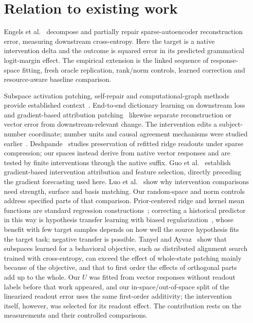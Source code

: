 \documentclass[11pt]{article}
\begin{document}
\section{Relation to existing work}
Engels et al.~\cite{engels2024} decompose and partially repair sparse-autoencoder reconstruction error, measuring downstream cross-entropy. Here the target is a native intervention delta and the outcome is squared error in its predicted grammatical logit-margin effect. The empirical extension is the linked sequence of response-space fitting, fresh oracle replication, rank/norm controls, learned correction and resource-aware baseline comparison.

Subspace activation patching, self-repair and computational-graph methods provide established context~\cite{makelov2023,rushing2024,ameisen2025,farnik2025}. End-to-end dictionary learning on downstream loss~\cite{braun2024} and gradient-based attribution patching~\cite{syed2023,kramar2024} likewise separate reconstruction or vector error from downstream-relevant change. The intervention edits a subject-number coordinate; number units and causal agreement mechanisms were studied earlier~\cite{lakretz2019,finlayson2021}. Deshpande~\cite{deshpande2026} studies preservation of refitted ridge readouts under sparse compression; our spaces instead derive from native vector responses and are tested by finite interventions through the native suffix. Guo et al.~\cite{guo2026} establish gradient-based intervention attribution and feature selection, directly preceding the gradient forecasting used here. Luo et al.~\cite{luo2026} show why intervention comparisons need strength, surface and basis matching. Our random-space and norm controls address specified parts of that comparison. Prior-centered ridge and kernel mean functions are standard regression constructions~\cite{rasmussen2006}; correcting a historical predictor in this way is hypothesis transfer learning with biased regularization~\cite{kuzborskij2013}, whose benefit with few target samples depends on how well the source hypothesis fits the target task; negative transfer is possible. Tanyel and Ayvaz~\cite{arxiv261105033} show that subspaces learned for a behavioral objective, such as distributed alignment search trained with cross-entropy, can exceed the effect of whole-state patching mainly because of the objective, and that to first order the effects of orthogonal parts add up to the whole. Our $U$ was fitted from vector responses without readout labels before that work appeared, and our in-space/out-of-space split of the linearized readout error uses the same first-order additivity; the intervention itself, however, was selected for its readout effect. The contribution rests on the measurements and their controlled comparisons.
\end{document}
